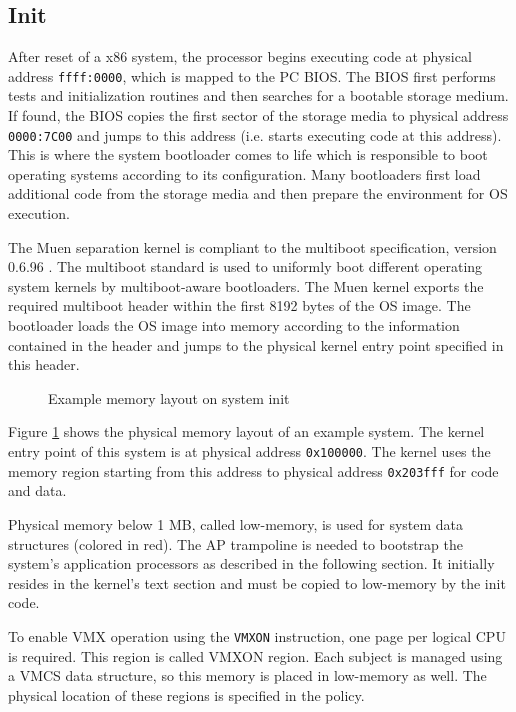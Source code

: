 \subsection{Init}\label{subsec:init}
After reset of a x86 system, the processor begins executing code at physical
address \texttt{ffff:0000}, which is mapped to the PC BIOS. The
BIOS first performs tests and initialization routines and then searches for a
bootable storage medium. If found, the BIOS copies the first sector of the
storage media to physical address \texttt{0000:7C00} and jumps to this address
(i.e. starts executing code at this address). This is where the system
bootloader comes to life which is responsible to boot operating systems
according to its configuration. Many bootloaders first load additional code
from the storage media and then prepare the environment for OS execution.

The Muen separation kernel is compliant to the multiboot specification, version
0.6.96 \cite{multiboot}. The multiboot standard is used to uniformly boot
different operating system kernels by multiboot-aware bootloaders.  The Muen
kernel exports the required multiboot header within the first 8192 bytes of the
OS image. The bootloader loads the OS image into memory according to the
information contained in the header and jumps to the physical kernel entry
point specified in this header.

\begin{figure}[h]
	\centering
	
	\caption{Example memory layout on system init}
	\label{fig:init-mem-layout-example}
\end{figure}

Figure \ref{fig:init-mem-layout-example} shows the physical memory layout of an
example system. The kernel entry point of this system is at physical address
\texttt{0x100000}. The kernel uses the memory region starting from this address
to physical address \texttt{0x203fff} for code and data.

Physical memory below 1 MB, called low-memory, is used for system data
structures (colored in red). The AP trampoline is
needed to bootstrap the system's application processors as described in the
following section. It initially resides in the kernel's text section and must
be copied to low-memory by the init code.

To enable VMX operation using the \texttt{VMXON} instruction, one page per
logical CPU is required. This region is called VMXON region. Each
subject is managed using a VMCS data structure, so this memory is
placed in low-memory as well. The physical location of these regions is
specified in the policy.

